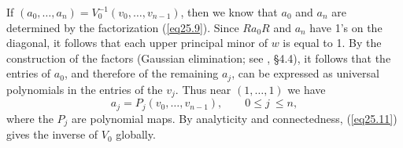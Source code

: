 \documentclass{surv-l}
\theoremstyle{plain}
\theoremstyle{definition}
\numberwithin{equation}{chapter}
\begin{document}
If $(a_{0},\ldots,a_{n})=V_{0}^{-1}(v_{0},\ldots,v_{n-1})$, then we know that $a_{0}$ and $a_{n}$ are determined by the factorization (\ref{eq25.9}). Since $Ra_{0}R$ and $a_{n}$ have 1's on the diagonal, it follows that each upper principal minor of $w$ is equal to 1. By the construction of the factors (Gaussian elimination; see \cite{Str}, \S 4.4), it follows that the entries of $a_{0}$, and therefore of the remaining $a_{j}$, can be expressed as universal polynomials in the entries of the $v_{j}$. Thus near $(1,\ldots,1)$ we have
\begin{equation}\label{eq25.11}
a_{j}=P_{j}(v_{0},\ldots, v_{n-1}), \qquad 0\leq j\ \leq n,
\end{equation}
where the $P_{j}$ are polynomial maps. By analyticity and connectedness, (\ref{eq25.11}) gives the inverse of $V_{0}$ globally.             \quad
\end{document}
